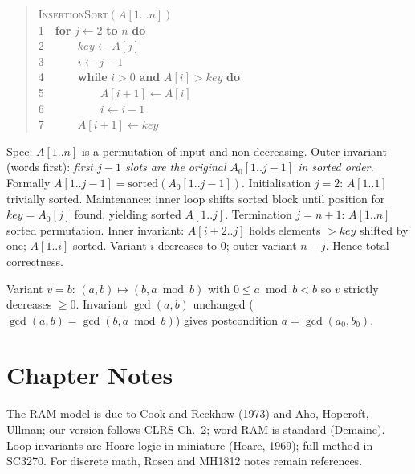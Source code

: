 \begin{example}
\begin{quote}\ttfamily
\textsc{InsertionSort}$(A[1\ldots n])$\\
1\ \ \textbf{for} $j\gets2$ \textbf{to} $n$ \textbf{do}\\
2\ \ \ \ \ \ $key\gets A[j]$\\
3\ \ \ \ \ \ $i\gets j-1$\\
4\ \ \ \ \ \ \textbf{while} $i>0$ \textbf{and} $A[i]>key$ \textbf{do}\\
5\ \ \ \ \ \ \ \ \ \ $A[i+1]\gets A[i]$\\
6\ \ \ \ \ \ \ \ \ \ $i\gets i-1$\\
7\ \ \ \ \ \ $A[i+1]\gets key$
\end{quote}
Spec: $A[1..n]$ is a permutation of input and non-decreasing. Outer invariant (words first): \emph{first $j-1$ slots are the original $A_0[1..j-1]$ in sorted order.} Formally $A[1..j-1]=\mathrm{sorted}(A_0[1..j-1])$. Initialisation $j=2$: $A[1..1]$ trivially sorted. Maintenance: inner loop shifts sorted block until position for $key=A_0[j]$ found, yielding sorted $A[1..j]$. Termination $j=n+1$: $A[1..n]$ sorted permutation. Inner invariant: $A[i+2..j]$ holds elements $>key$ shifted by one; $A[1..i]$ sorted. Variant $i$ decreases to $0$; outer variant $n-j$. Hence total correctness.
\end{example}
\begin{example} Variant $v=b$: $(a,b)\mapsto(b,a\bmod b)$ with $0\le a\bmod b<b$ so $v$ strictly decreases $\ge0$. Invariant $\gcd(a,b)$ unchanged ($\gcd(a,b)=\gcd(b,a\bmod b)$) gives postcondition $a=\gcd(a_0,b_0)$. \end{example}

\section{Chapter Notes}
The RAM model is due to Cook and Reckhow (1973) and Aho, Hopcroft, Ullman; our version follows CLRS Ch.~2; word-RAM is standard (Demaine). Loop invariants are Hoare logic in miniature (Hoare, 1969); full method in SC3270. For discrete math, Rosen and MH1812 notes remain references.

